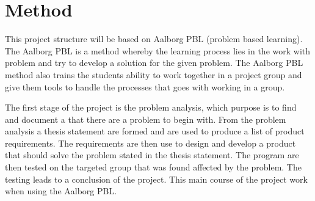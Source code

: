 \section{Method}
This project structure will be based on Aalborg PBL (problem based learning). The Aalborg PBL is a method whereby the learning process lies in the work with problem and try to develop a solution for the given problem.
The Aalborg PBL method also trains the students ability to work together in a project group and give them tools to handle the processes that goes with working in a group.

The first stage of the project is the problem analysis, which purpose is to find and document a that there are a problem to begin with. From the problem analysis a thesis statement are formed and are used to produce a list of product requirements.
The requirements are then use to design and develop a product that should solve the problem stated in the thesis statement.
The program are then tested on the targeted group that was found affected by the problem. The testing leads to a conclusion of the project. This main course of the project work when using the Aalborg PBL.


